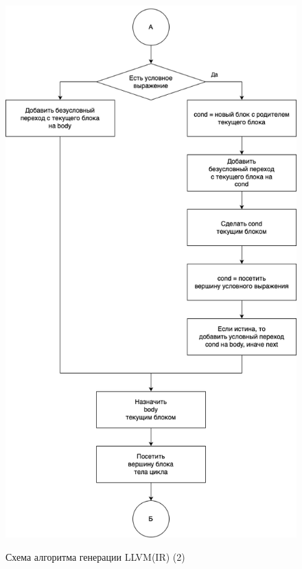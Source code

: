 \begin{figure}[h!]
	\begin{center}
		{\includegraphics[scale = 0.5, angle=0]{../img/llvm/alg-2.png}}
		\caption{Схема алгоритма генерации LLVM(IR) (2)}
		\label{fig:alg-2}
	\end{center}
\end{figure}

